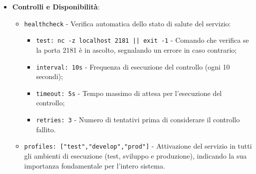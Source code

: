 \documentclass[10pt]{article}
\begin{document}
\begin{itemize}
        \item \textbf{Controlli e Disponibilità}:
        \begin{itemize}
            \item \texttt{healthcheck} - Verifica automatica dello stato di salute del servizio:
            \begin{itemize}
                \item \texttt{test: nc -z localhost 2181 || exit -1} - Comando che verifica se la porta 2181 è in ascolto, segnalando un errore in caso contrario;
                \item \texttt{interval: 10s} - Frequenza di esecuzione del controllo (ogni 10 secondi);
                \item \texttt{timeout: 5s} - Tempo massimo di attesa per l'esecuzione del controllo;
                \item \texttt{retries: 3} - Numero di tentativi prima di considerare il controllo fallito.
            \end{itemize}
            \item \texttt{profiles: ["test","develop","prod"]} - Attivazione del servizio in tutti gli ambienti di esecuzione (test, sviluppo e produzione), indicando la sua importanza fondamentale per l'intero sistema.
        \end{itemize}
        \end{itemize}
\end{document}
